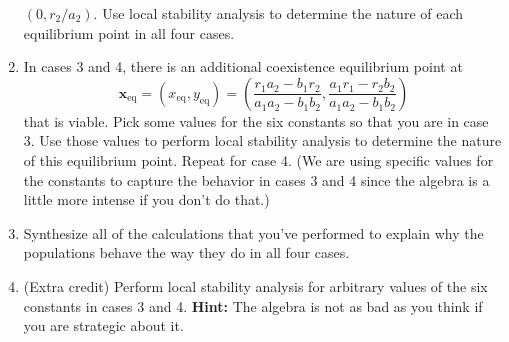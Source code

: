 \documentclass[12pt,letterpaper]{hmcpset}
\newcommand{\f}[2]{\frac{#1}{#2}}
\newcommand{\pn}[1]{\left(#1\right)}
\renewcommand{\t}[1]{\text{#1}}
\renewcommand{\bf}[1]{\mathbf{#1}}
\begin{document}
\begin{problem}[3]
\begin{enumerate}
            $(0,r_2/a_2)$. Use local stability analysis to determine the
            nature of each equilibrium point in all four cases.
        \item In cases 3 and 4, there is an additional coexistence
            equilibrium point at
            \[
                \bf{x}_{\t{eq}}=\pn{x_{\t{eq}},y_{\t{eq}}}
                =\pn{\f{r_1a_2-b_1r_2}{a_1a_2-b_1b_2},
                \f{a_1r_1-r_2b_2}{a_1a_2-b_1b_2}}
            \]
            that is viable.  Pick some values for the six constants so
            that you are in case 3.  Use those values to perform local
            stability analysis to determine the nature of this
            equilibrium point.  Repeat for case 4. (We are using
            specific values for the constants to capture the behavior
            in cases 3 and 4 since the algebra is a little more
            intense if you don't do that.)
        \item Synthesize all of the calculations that you've performed
            to explain why the populations behave the way they do in all
            four cases.
        \item (Extra credit) Perform local stability analysis for
            arbitrary values of the six constants in cases 3 and 4.
            \textbf{Hint:} The algebra is not as bad as you think if you
            are strategic about it.
    \end{enumerate}
\end{problem}
\newpage
\begin{solution}
    \null\vfill
\end{solution}
\newpage
\end{document}
